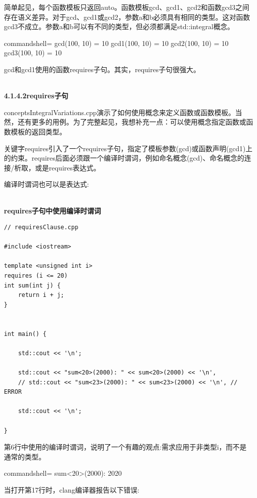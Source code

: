 简单起见，每个函数模板只返回auto。函数模板gcd、gcd1、gcd2和函数gcd3之间存在语义差异。对于gcd、gcd1或gcd2，参数a和b必须具有相同的类型。这对函数gcd3不成立。参数a和b可以有不同的类型，但必须都满足std::integral概念。

\begin{tcblisting}{commandshell={}}
gcd(100, 10) = 10
gcd1(100, 10) = 10
gcd2(100, 10) = 10
gcd3(100, 10) = 10
\end{tcblisting}

gcd和gcd1使用的函数requires子句。其实，requires子句很强大。

\hspace*{\fill} \\ %
\noindent
\textbf{4.1.4.2\hspace{0.2cm}requires子句}

conceptsIntegralVariations.cpp演示了如何使用概念来定义函数或函数模板。当然，还有更多的用例。为了完整起见，我想补充一点：可以使用概念指定函数或函数模板的返回类型。

关键字requires引入了一个requires子句，指定了模板参数(gcd)或函数声明(gcd1)上的约束。requires后面必须跟一个编译时谓词，例如命名概念(gcd)、命名概念的连接/析取，或是requires表达式。

编译时谓词也可以是表达式:

\hspace*{\fill} \\ %
\noindent
\textbf{requires子句中使用编译时谓词}
\begin{lstlisting}[style=styleCXX]
// requiresClause.cpp

#include <iostream>

template <unsigned int i>
requires (i <= 20)
int sum(int j) {
	return i + j;
}


int main() {

	std::cout << '\n';
	
	std::cout << "sum<20>(2000): " << sum<20>(2000) << '\n',
	// std::cout << "sum<23>(2000): " << sum<23>(2000) << '\n', // ERROR
	
	std::cout << '\n';

}
\end{lstlisting}

第6行中使用的编译时谓词，说明了一个有趣的观点:需求应用于非类型i，而不是通常的类型。

\begin{tcblisting}{commandshell={}}
sum<20>(2000): 2020
\end{tcblisting}

当打开第17行时，clang编译器报告以下错误:

